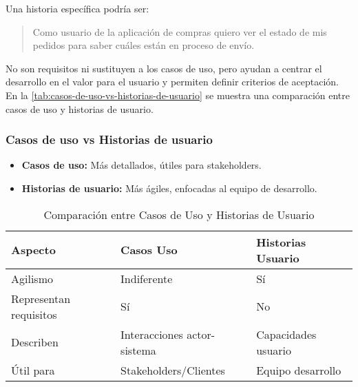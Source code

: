     Una historia específica podría ser:

    \begin{exemplo}

        \begin{quote}

            Como usuario de la aplicación de compras quiero ver el estado de mis pedidos para saber cuáles están en proceso de envío.

        \end{quote}

    \end{exemplo}

    No son requisitos ni sustituyen a los casos de uso, pero ayudan a centrar el desarrollo en el valor para el usuario y permiten definir criterios de aceptación.
    En la \autoref{tab:casos-de-uso-vs-historias-de-usuario} se muestra una comparación entre casos de uso y historias de usuario.

    \subsubsection*{Casos de uso vs Historias de usuario}


    \begin{itemize}

        \item \textbf{Casos de uso:} Más detallados, útiles para stakeholders.

        \item \textbf{Historias de usuario:} Más ágiles, enfocadas al equipo de desarrollo.

    \end{itemize}


    \begin{table}
        \centering
        \begin{tabular}{lll}
            \toprule
            \textbf{Aspecto}       & \textbf{Casos Uso}          & \textbf{Historias Usuario} \\
            \midrule
            Agilismo               & Indiferente                 & Sí                         \\
            Representan requisitos & Sí                          & No                         \\
            Describen              & Interacciones actor-sistema & Capacidades usuario        \\
            Útil para              & Stakeholders/Clientes       & Equipo desarrollo          \\
            \bottomrule
        \end{tabular}
        \caption{Comparación entre Casos de Uso y Historias de Usuario}
        \label{tab:casos-de-uso-vs-historias-de-usuario}
    \end{table}





